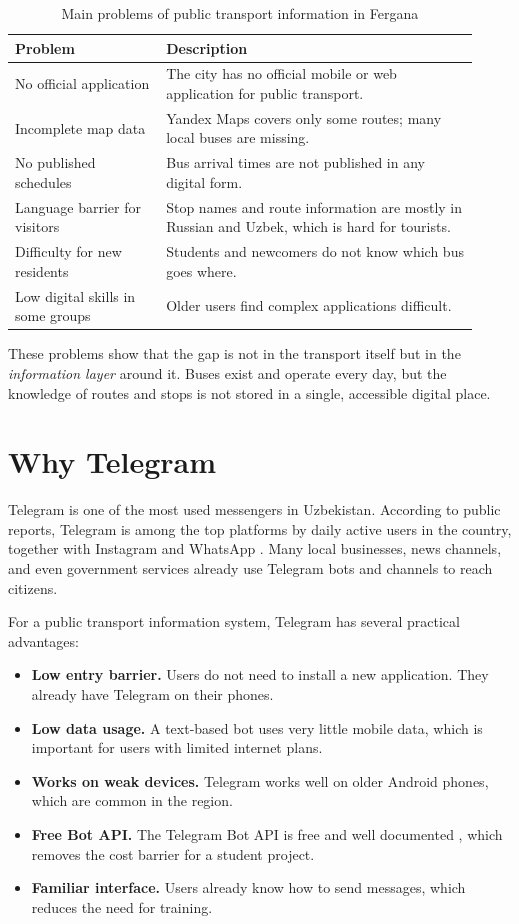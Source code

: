 \begin{table}[H]
\centering
\caption{Main problems of public transport information in Fergana}
\label{tab:problems}
\begin{tabular}{p{0.30\linewidth} p{0.62\linewidth}}
\hline
\textbf{Problem} & \textbf{Description} \\
\hline
No official application & The city has no official mobile or web
application for public transport. \\
Incomplete map data & Yandex Maps covers only some routes; many local
buses are missing. \\
No published schedules & Bus arrival times are not published in any
digital form. \\
Language barrier for visitors & Stop names and route information are
mostly in Russian and Uzbek, which is hard for tourists. \\
Difficulty for new residents & Students and newcomers do not know which
bus goes where. \\
Low digital skills in some groups & Older users find complex
applications difficult. \\
\hline
\end{tabular}
\end{table}

These problems show that the gap is not in the transport itself but in
the \emph{information layer} around it. Buses exist and operate every
day, but the knowledge of routes and stops is not stored in a single,
accessible digital place.

\section{Why Telegram}
\label{sec:why-telegram}

Telegram is one of the most used messengers in Uzbekistan. According to
public reports, Telegram is among the top platforms by daily active
users in the country, together with Instagram and WhatsApp
\cite{datareportal_uz_2024}. Many local businesses, news channels, and
even government services already use Telegram bots and channels to
reach citizens.

For a public transport information system, Telegram has several
practical advantages:

\begin{itemize}
  \item \textbf{Low entry barrier.} Users do not need to install a new
  application. They already have Telegram on their phones.
  \item \textbf{Low data usage.} A text-based bot uses very little
  mobile data, which is important for users with limited internet
  plans.
  \item \textbf{Works on weak devices.} Telegram works well on older
  Android phones, which are common in the region.
  \item \textbf{Free Bot API.} The Telegram Bot API is free and well
  documented \cite{telegram_botapi}, which removes the cost barrier
  for a student project.
  \item \textbf{Familiar interface.} Users already know how to send
  messages, which reduces the need for training.
\end{itemize}

